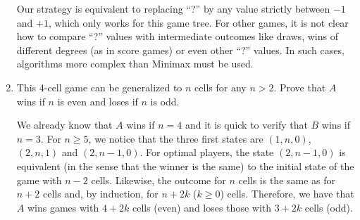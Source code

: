 \documentclass[11pt, a4paper]{article}
\begin{document}
\begin{enumerate}
\begin{solution}
\begin{figure}[H]
{}
        \end{figure}

        Our strategy is equivalent to replacing \enquote{?} by any value strictly between $-1$ and $+1$, which only works for this game tree. For other games, it is not clear how to compare \enquote{?} values with intermediate outcomes like draws, wins of different degrees (as in score games) or even other \enquote{?} values. In such cases, algorithms more complex than Minimax must be used.
    \end{solution}

    \item This 4-cell game can be generalized to $n$ cells for any $n > 2$. Prove that $A$ wins if $n$ is even and loses if $n$ is odd.

    \begin{solution}
        We already know that $A$ wins if $n = 4$ and it is quick to verify that $B$ wins if $n = 3$. For $n \geq 5$, we notice that the three first states are $(1, n, 0)$, $(2, n, 1)$ and $(2, n - 1, 0)$. For optimal players, the state $(2, n - 1, 0)$ is equivalent (in the sense that the winner is the same) to the initial state of the game with $n - 2$ cells. Likewise, the outcome for $n$ cells is the same as for $n + 2$ cells and, by induction, for $n + 2k$ ($k \geq 0$) cells. Therefore, we have that $A$ wins games with $4 + 2k$ cells (even) and loses those with $3 + 2k$ cells (odd).
    \end{solution}
\end{enumerate}

\startquiz
\end{document}
